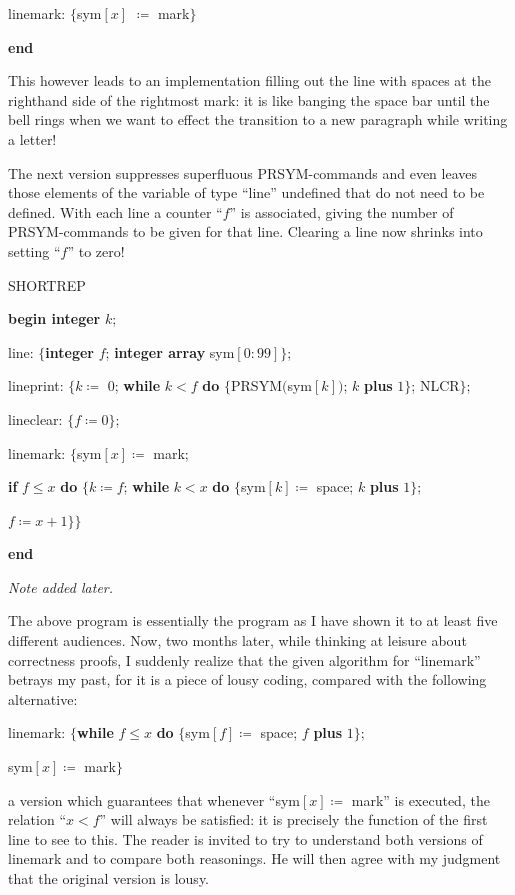 \documentclass[twoside,11pt]{book}
\begin{document}
\noindent
\quad linemark: $\{$sym$[x]$ $\coloneq$ mark$\}$

\noindent
\textbf{end}

This however leads to an implementation filling out the line with spaces at the righthand side of the rightmost mark: it is like banging the space bar until the bell rings when we want to effect the transition to a new paragraph while writing a letter!

The next version suppresses superfluous PRSYM-commands and even leaves those elements of the variable of type ``line'' undefined that do not need to be defined. With each line a counter ``$f$'' is associated, giving the number of PRSYM-commands to be given for that line. Clearing a line now shrinks into setting ``$f$'' to zero!

\noindent
SHORTREP

\noindent
\textbf{begin integer} $k$;

\noindent
\quad line: $\{$\textbf{integer} $f$; \textbf{integer array} sym$[0 : 99]\}$;

\noindent
\quad lineprint: $\{k \coloneq$ 0; \textbf{while} $k < f$ \textbf{do} $\{$PRSYM$($sym$[k])$; $k$ \textbf{plus} $1\}$; NLCR$\}$;

\noindent
\quad lineclear: $\{f \coloneq 0\}$;

\noindent
\quad linemark: $\{$sym$[x] \coloneq$ mark;

\noindent
\quad \textbf{if} $f \leqslant x$ \textbf{do} $\{k \coloneq f$; \textbf{while} $k < x$ \textbf{do} $\{$sym$[k] \coloneq$ space; $k$ \textbf{plus} $1\}$;

\noindent
\quad \quad $f \coloneq x + 1\}\}$

\noindent
\textbf{end}

\noindent
\textit{Note added later.}

The above program is essentially the program as I have shown it to at least five different audiences. Now, two months later, while thinking at leisure about correctness proofs, I suddenly realize that the given algorithm for ``linemark'' betrays my past, for it is a piece of lousy coding, compared with the following alternative:

linemark: $\{$\textbf{while} $f \leqslant x$ \textbf{do} $\{$sym$[f] \coloneq$ space; $f$ \textbf{plus} $1\};$
	
\quad sym$[x] \coloneq$ mark$\}$

\noindent
a version which guarantees that whenever ``sym$[x] \coloneq$ mark'' is executed, the relation ``$x < f$'' will always be satisfied: it is precisely the function of the first line to see to this. The reader is invited to try to understand both versions of linemark and to compare both reasonings. He will then agree with my judgment that the original version is lousy.
\end{document}
